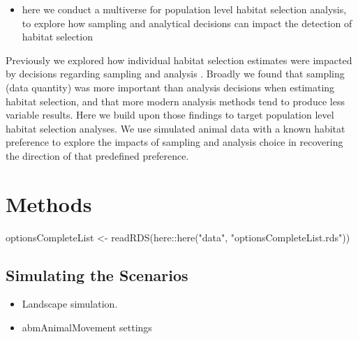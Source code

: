 \documentclass[10pt,a4paper]{article}
\newenvironment{Shaded}{}{}
\newcommand{\FunctionTok}[1]{#1}
\newcommand{\NormalTok}[1]{#1}
\newcommand{\OtherTok}[1]{#1}
\newcommand{\SpecialCharTok}[1]{#1}
\newcommand{\StringTok}[1]{#1}
\providecommand{\tightlist}{%
  \setlength{\itemsep}{0pt}\setlength{\parskip}{0pt}}
\begin{document}
\begin{itemize}
\tightlist
\item
  here we conduct a multiverse for population level habitat selection analysis, to explore how sampling and analytical decisions can impact the detection of habitat selection
\end{itemize}

Previously we explored how individual habitat selection estimates were impacted by decisions regarding sampling and analysis .
Broadly we found that sampling (data quantity) was more important than analysis decisions when estimating habitat selection, and that more modern analysis methods tend to produce less variable results.
Here we build upon those findings to target population level habitat selection analyses. We use simulated animal data with a known habitat preference to explore the impacts of sampling and analysis choice in recovering the direction of that predefined preference.

\hypertarget{methods}{%
\section{Methods}\label{methods}}

\begin{Shaded}
\begin{Highlighting}[]
\NormalTok{optionsCompleteList }\OtherTok{\textless{}{-}} \FunctionTok{readRDS}\NormalTok{(here}\SpecialCharTok{::}\FunctionTok{here}\NormalTok{(}\StringTok{"data"}\NormalTok{, }\StringTok{"optionsCompleteList.rds"}\NormalTok{))}
\end{Highlighting}
\end{Shaded}

\hypertarget{simulating-the-scenarios}{%
\subsection{Simulating the Scenarios}\label{simulating-the-scenarios}}

\begin{itemize}
\item
  Landscape simulation.
\item
  abmAnimalMovement settings
\end{itemize}
\end{document}
